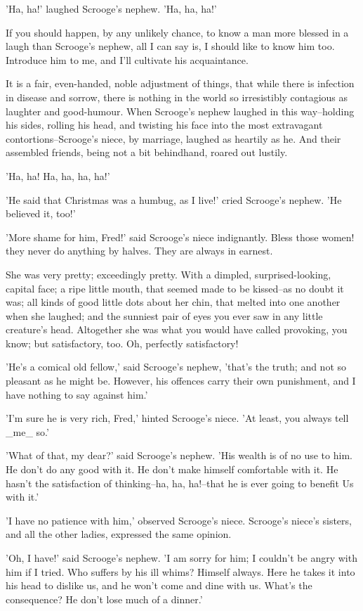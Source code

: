 'Ha, ha!' laughed Scrooge's nephew. 'Ha, ha, ha!'

If you should happen, by any unlikely chance, to know a man more blessed
in a laugh than Scrooge's nephew, all I can say is, I should like to
know him too. Introduce him to me, and I'll cultivate his acquaintance.

It is a fair, even-handed, noble adjustment of things, that while there
is infection in disease and sorrow, there is nothing in the world so
irresistibly contagious as laughter and good-humour. When Scrooge's
nephew laughed in this way--holding his sides, rolling his head, and
twisting his face into the most extravagant contortions--Scrooge's
niece, by marriage, laughed as heartily as he. And their assembled
friends, being not a bit behindhand, roared out lustily.

'Ha, ha! Ha, ha, ha, ha!'

'He said that Christmas was a humbug, as I live!' cried Scrooge's
nephew. 'He believed it, too!'

'More shame for him, Fred!' said Scrooge's niece indignantly. Bless
those women! they never do anything by halves. They are always in
earnest.

She was very pretty; exceedingly pretty. With a dimpled,
surprised-looking, capital face; a ripe little mouth, that seemed made
to be kissed--as no doubt it was; all kinds of good little dots about
her chin, that melted into one another when she laughed; and the
sunniest pair of eyes you ever saw in any little creature's head.
Altogether she was what you would have called provoking, you know; but
satisfactory, too. Oh, perfectly satisfactory!

'He's a comical old fellow,' said Scrooge's nephew, 'that's the truth;
and not so pleasant as he might be. However, his offences carry their
own punishment, and I have nothing to say against him.'

'I'm sure he is very rich, Fred,' hinted Scrooge's niece. 'At least, you
always tell _me_ so.'

'What of that, my dear?' said Scrooge's nephew. 'His wealth is of no use
to him. He don't do any good with it. He don't make himself comfortable
with it. He hasn't the satisfaction of thinking--ha, ha, ha!--that he is
ever going to benefit Us with it.'

'I have no patience with him,' observed Scrooge's niece. Scrooge's
niece's sisters, and all the other ladies, expressed the same opinion.

'Oh, I have!' said Scrooge's nephew. 'I am sorry for him; I couldn't be
angry with him if I tried. Who suffers by his ill whims? Himself always.
Here he takes it into his head to dislike us, and he won't come and dine
with us. What's the consequence? He don't lose much of a dinner.'

